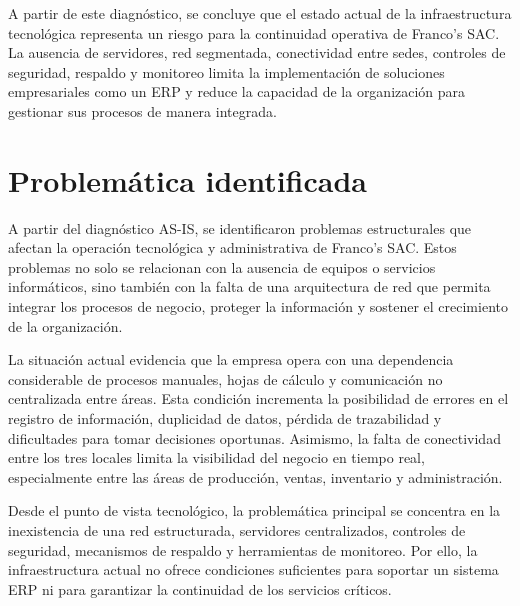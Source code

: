 \documentclass[11pt, a4paper, oneside]{report}
\begin{document}
A partir de este diagnóstico, se concluye que el estado actual de la infraestructura tecnológica representa un riesgo para la continuidad operativa de Franco's SAC. La ausencia de servidores, red segmentada, conectividad entre sedes, controles de seguridad, respaldo y monitoreo limita la implementación de soluciones empresariales como un ERP y reduce la capacidad de la organización para gestionar sus procesos de manera integrada.

\section{Problemática identificada}

A partir del diagnóstico AS-IS, se identificaron problemas estructurales que afectan la operación tecnológica y administrativa de Franco's SAC. Estos problemas no solo se relacionan con la ausencia de equipos o servicios informáticos, sino también con la falta de una arquitectura de red que permita integrar los procesos de negocio, proteger la información y sostener el crecimiento de la organización.

La situación actual evidencia que la empresa opera con una dependencia considerable de procesos manuales, hojas de cálculo y comunicación no centralizada entre áreas. Esta condición incrementa la posibilidad de errores en el registro de información, duplicidad de datos, pérdida de trazabilidad y dificultades para tomar decisiones oportunas. Asimismo, la falta de conectividad entre los tres locales limita la visibilidad del negocio en tiempo real, especialmente entre las áreas de producción, ventas, inventario y administración.

Desde el punto de vista tecnológico, la problemática principal se concentra en la inexistencia de una red estructurada, servidores centralizados, controles de seguridad, mecanismos de respaldo y herramientas de monitoreo. Por ello, la infraestructura actual no ofrece condiciones suficientes para soportar un sistema ERP ni para garantizar la continuidad de los servicios críticos.
\end{document}
